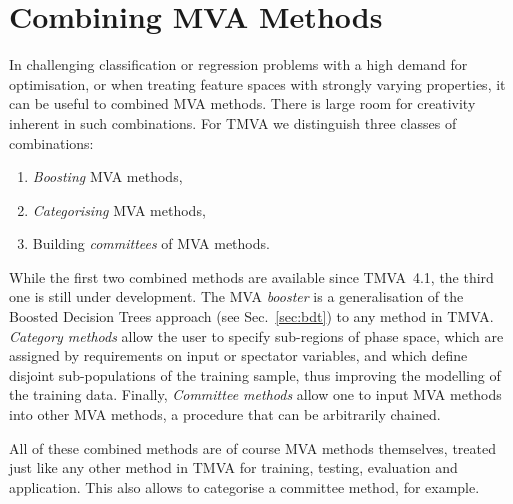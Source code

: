 \section{Combining MVA Methods}
\label{sec:combine}

In challenging classification or regression problems with a high demand for 
optimisation, or when treating feature spaces with strongly varying properties, 
it can be useful to combined MVA methods. There is large room for creativity 
inherent in such combinations. For TMVA we distinguish three classes of 
combinations:
\begin{enumerate}

\item {\em Boosting} MVA methods,

\item {\em Categorising} MVA methods,

\item Building {\em committees} of MVA methods.

\end{enumerate}
While the first two combined methods are available since TMVA~4.1, the third one is still 
under development. The MVA {\em booster} is a generalisation of the Boosted Decision 
Trees approach (see Sec.~\ref{sec:bdt})
to any method in TMVA. {\em Category methods} allow the user to specify
sub-regions of phase space, which are assigned by requirements on input 
or spectator variables, and which define disjoint sub-populations of the training 
sample, thus improving the modelling of the training data. Finally, {\em Committee methods} 
allow one to input MVA methods into other MVA methods, a procedure that can be arbitrarily 
chained. 

All of these combined methods are of course MVA methods themselves, treated just like 
any other method in TMVA for training, testing, evaluation and application. This also 
allows to categorise a committee method, for example. 




